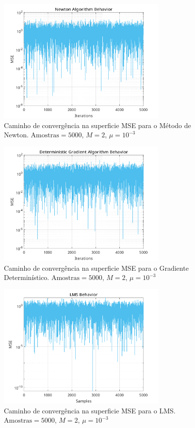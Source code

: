 \documentclass[a4paper,10pt]{article}
\begin{document}
\begin{enumerate}
				\begin{figure}[!ht]
					\centering
					\includegraphics[width=0.75\textwidth]{figs/newton_mse.png}
					\caption{Caminho de convergência na superficie MSE para o Método de Newton. $\text{Amostras} = 5000$, $M = 2$, $\mu = 10^{-3}$}
					\label{fig:newton_mse}
				\end{figure}
				
				\begin{figure}[!ht]
					\centering
					\includegraphics[width=0.75\textwidth]{figs/gradient_mse.png}
					\caption{Caminho de convergência na superficie MSE para o Gradiente Determinístico. $\text{Amostras} = 5000$, $M = 2$, $\mu = 10^{-3}$}
					\label{fig:gradient_mse}
				\end{figure}

				\begin{figure}[!ht]
					\centering
					\includegraphics[width=0.75\textwidth]{figs/lms_mse.png}
					\caption{Caminho de convergência na superficie MSE para o LMS. $\text{Amostras}  = 5000$, $M = 2$, $\mu = 10^{-3}$}
					\label{fig:lms_mse}
				\end{figure}


\end{enumerate}
\end{document}
